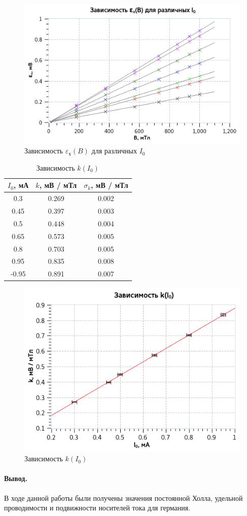 \documentclass{article}
\begin{document}
   \begin{figure}[h]
   \centering
   \includegraphics[width=12cm]{plot2.png} 
   \caption{Зависимость $\varepsilon_{\text{х}}(B)$ для различных $I_0$} 
   \label{fig.exb1} 
   \end{figure}

   \begin{table} 
   \begin{center}
   \caption{Зависимость $k(I_0)$}
   \label{ki0}
   \begin{tabular}{|*{3}{c|}}
   \hline 
   $I_0$, мА & $k$, мВ / мТл & $\sigma_k$, мВ / мТл \\ \hline 
   0.3 & 0.269 & 0.002 \\ \hline 
   0.45 & 0.397 & 0.003 \\ \hline 
   0.5 & 0.448 & 0.004 \\ \hline 
   0.65 & 0.573 & 0.005 \\ \hline 
   0.8 & 0.703 & 0.005 \\ \hline 
   0.95 & 0.835 & 0.008 \\ \hline 
   -0.95 & 0.891 & 0.007 \\ \hline 
   \end{tabular}
   \end{center}
   \end{table} 

   \begin{figure}[h]
   \centering
   \includegraphics[width=12cm]{plot3.png} 
   \caption{Зависимость $k(I_0)$} 
   \label{fig.ki0} 
   \end{figure}

   \paragraph*{Вывод.} В ходе данной работы были получены значения постоянной Холла, удельной проводимости и подвижности носителей тока для германия.
\end{document}
